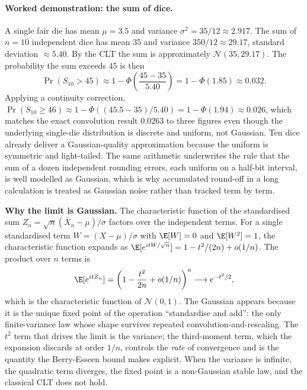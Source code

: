

\paragraph{Worked demonstration: the sum of dice.} A single fair
die has mean $\mu = 3.5$ and variance $\sigma^{2} = 35/12 \approx
2.917$. The sum of $n = 10$ independent dice has mean $35$ and
variance $350/12 \approx 29.17$, standard deviation $\approx 5.40$.
By the CLT the sum is approximately $\mathcal{N}(35, 29.17)$. The
probability the sum exceeds $45$ is then
\[
\Pr(S_{10} > 45) \approx 1 - \Phi\!\left(\frac{45 - 35}{5.40}\right)
= 1 - \Phi(1.85) \approx 0.032.
\]
Applying a continuity correction, $\Pr(S_{10} \geq 46) \approx 1 -
\Phi((45.5 - 35)/5.40) = 1 - \Phi(1.94) \approx 0.026$, which
matches the exact convolution result $0.0263$ to three figures even
though the underlying single-die distribution is discrete and
uniform, not Gaussian. Ten dice already deliver a Gaussian-quality
approximation because the uniform is symmetric and light-tailed.
The same arithmetic underwrites the rule that the sum of a dozen
independent rounding errors, each uniform on a half-bit interval,
is well modelled as Gaussian, which is why accumulated round-off in
a long calculation is treated as Gaussian noise rather than tracked
term by term.

\begin{mastery}
\textbf{Why the limit is Gaussian.} The characteristic function of
the standardised sum $Z_{n} = \sqrt{n}(\bar X_{n} - \mu)/\sigma$
factors over the independent terms. For a single standardised term
$W = (X - \mu)/\sigma$ with $\E[W] = 0$ and $\E[W^{2}] = 1$, the
characteristic function expands as $\E[e^{itW/\sqrt{n}}] = 1 -
t^{2}/(2n) + o(1/n)$. The product over $n$ terms is
\[
\E[e^{itZ_{n}}] = \left(1 - \frac{t^{2}}{2n} + o(1/n)\right)^{n}
\longrightarrow e^{-t^{2}/2},
\]
which is the characteristic function of $\mathcal{N}(0, 1)$. The
Gaussian appears because it is the unique fixed point of the
operation ``standardise and add'': the only finite-variance law
whose shape survives repeated convolution-and-rescaling. The $t^{2}$
term that drives the limit is the variance; the third-moment term,
which the expansion discards at order $1/n$, controls the
\emph{rate} of convergence and is the quantity the Berry-Esseen
bound makes explicit. When the variance is infinite, the quadratic
term diverges, the fixed point is a non-Gaussian stable law, and the
classical CLT does not hold.
\end{mastery}

